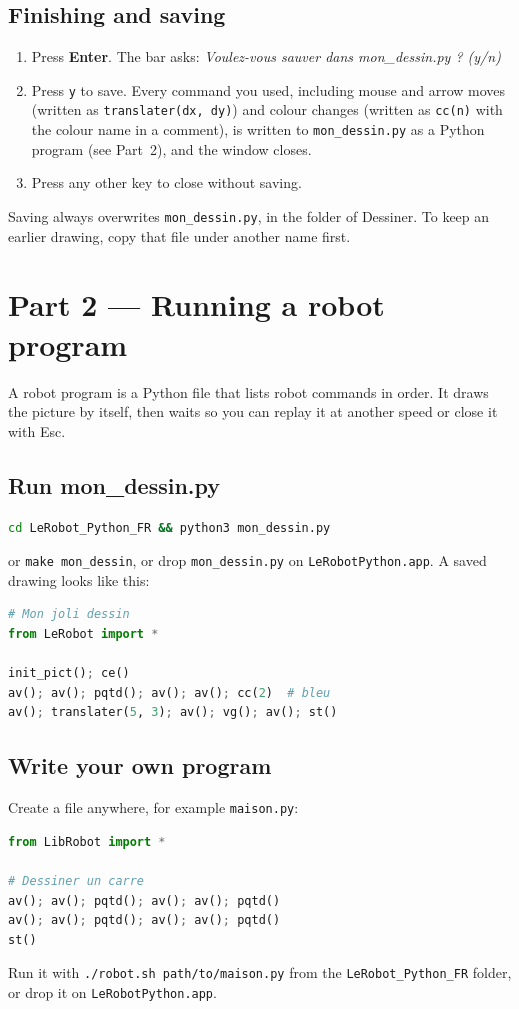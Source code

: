 \documentclass[11pt,a4paper]{article}
\newcommand{\kbd}[1]{\texttt{#1}}
\begin{document}
\subsection{Finishing and saving}
\begin{enumerate}
\item Press \textbf{Enter}. The bar asks:
  \emph{Voulez-vous sauver dans mon\_dessin.py ? (y/n)}
\item Press \kbd{y} to save. Every command you used, including mouse and
  arrow moves (written as \kbd{translater(dx, dy)}) and colour changes
  (written as \kbd{cc(n)} with the colour name in a comment), is written to
  \kbd{mon\_dessin.py} as a Python program (see Part~2), and the window
  closes.
\item Press any other key to close without saving.
\end{enumerate}
Saving always overwrites \kbd{mon\_dessin.py}, in the folder of
Dessiner. To keep an earlier drawing, copy that file under another name
first.

\section{Part 2 --- Running a robot program}

A robot program is a Python file that lists robot commands in order. It
draws the picture by itself, then waits so you can replay it at another
speed or close it with Esc.

\subsection{Run mon\_dessin.py}
\begin{lstlisting}[language=bash]
cd LeRobot_Python_FR && python3 mon_dessin.py
\end{lstlisting}
or \kbd{make mon\_dessin}, or drop \kbd{mon\_dessin.py} on
\kbd{LeRobotPython.app}. A saved drawing looks like this:
\begin{lstlisting}[language=Python]
# Mon joli dessin
from LeRobot import *

init_pict(); ce()
av(); av(); pqtd(); av(); av(); cc(2)  # bleu
av(); translater(5, 3); av(); vg(); av(); st()
\end{lstlisting}

\subsection{Write your own program}
Create a file anywhere, for example \kbd{maison.py}:
\begin{lstlisting}[language=Python]
from LibRobot import *

# Dessiner un carre
av(); av(); pqtd(); av(); av(); pqtd()
av(); av(); pqtd(); av(); av(); pqtd()
st()
\end{lstlisting}
Run it with \kbd{./robot.sh path/to/maison.py} from the
\kbd{LeRobot\_Python\_FR} folder, or drop it on \kbd{LeRobotPython.app}.
\end{document}
